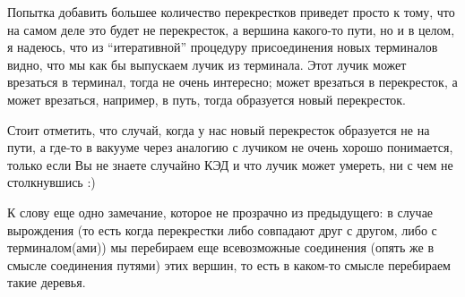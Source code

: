 \begin{solution}
\begin{upd}
        Попытка добавить большее количество перекрестков приведет просто к тому, что на самом деле это будет не перекресток, а вершина какого-то пути, но и в целом, я надеюсь, что из ``итеративной'' процедуру присоединения новых терминалов видно, что мы как бы выпускаем лучик из терминала. 
        Этот лучик может врезаться в терминал, тогда не очень интересно; может врезаться в перекресток, а может врезаться, например, в путь, тогда образуется новый перекресток.
        
        Стоит отметить, что случай, когда у нас новый перекресток образуется не на пути, а где-то в вакууме через аналогию с лучиком не очень хорошо понимается, только если Вы не знаете случайно КЭД и что лучик может умереть, ни с чем не столкнувшись :)

        К слову еще одно замечание, которое не прозрачно из предыдущего: в случае вырождения (то есть когда перекрестки либо совпадают друг с другом, либо с терминалом(ами)) мы перебираем еще всевозможные соединения (опять же в смысле соединения путями) этих вершин, то есть в каком-то смысле перебираем такие деревья.
    \end{upd}
\end{solution}